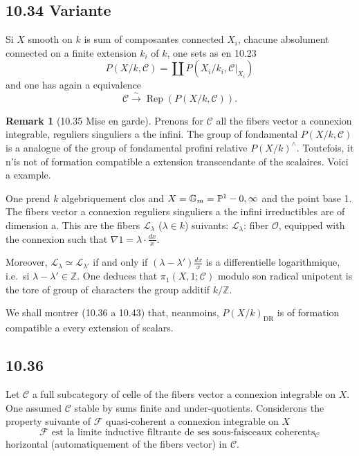 \documentclass[12pt,a4paper]{article}
\theoremstyle{plain}
\theoremstyle{definition}
\newtheorem{remark}[theorem]{Remark}
\theoremstyle{remark}
\DeclareMathOperator{\Rep}{Rep}
\newcommand{\Gm}{\mathbb{G}_m}
\newcommand{\Z}{\mathbb{Z}}
\newcommand{\DR}{\mathrm{DR}}
\begin{document}
\subsection*{10.34 Variante}

Si $X$ smooth on $k$ is sum of composantes connected $X_i$, chacune absolument connected on a finite extension $k_i$ of $k$, one sets as en 10.23
$$P(X/k, \mathcal{C}) = \coprod P(X_i/k_i, \mathcal{C}|_{X_i})$$
and one has again a equivalence
\begin{equation}\label{10.34.1}
\mathcal{C} \xrightarrow{\sim} \Rep(P(X/k, \mathcal{C})). \tag{10.34.1}
\end{equation}

\begin{remark}[10.35 Mise en garde]
Prenons for $\mathcal{C}$ all the fibers vector a connexion integrable, reguliers singuliers a the infini. The group of fondamental $P(X/k, \mathcal{C})$ is a analogue of the group of fondamental profini relative $P(X/k)^\wedge$. Toutefois, it n'is not of formation compatible a extension transcendante of the scalaires. Voici a example.

One prend $k$ algebriquement clos and $X = \Gm = \mathbb{P}^1 - \\{0, \infty\\}$ and the point base 1. The fibers vector a connexion reguliers singuliers a the infini irreductibles are of dimension a. This are the fibers $\mathcal{L}_\lambda$ ($\lambda \in k$) suivants:
$\mathcal{L}_\lambda$: fiber $\mathcal{O}$, equipped with the connexion such that $\nabla 1 = \lambda \cdot \frac{dx}{x}$.

Moreover, $\mathcal{L}_\lambda \simeq \mathcal{L}_{\lambda'}$ if and only if $(\lambda - \lambda')\frac{dx}{x}$ is a differentielle logarithmique, i.e.~si $\lambda - \lambda' \in \Z$. One deduces that $\pi_1(X, 1; \mathcal{C})$ modulo son radical unipotent is the tore of group of characters the group additif $k/\Z$.

We shall montrer (10.36 a 10.43) that, neanmoins, $P(X/k)_{\DR}$ is of formation compatible a every extension of scalars.
\end{remark}

\subsection*{10.36}

Let $\mathcal{C}$ a full subcategory of celle of the fibers vector a connexion integrable on $X$. One assumed $\mathcal{C}$ stable by sums finite and under-quotients. Considerons the property suivante of $\mathcal{F}$ quasi-coherent a connexion integrable on $X$
\begin{equation}\label{10.36.1}
\mathcal{F} \text{ est la limite inductive filtrante de ses sous-faisceaux coherents} \tag{10.36.1}_{\mathcal{C}}
\end{equation}
horizontal (automatiquement of the fibers vector) in $\mathcal{C}$.
\end{document}
